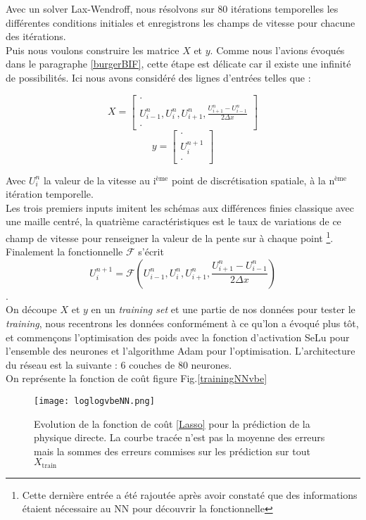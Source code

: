 \documentclass[a4paper,12pt]{article}
\newcommand{\bepar}[1]{
	\left( #1 \right)  
}
\numberwithin{equation}{section} %
\begin{document}
\noindent Avec un solver Lax-Wendroff, nous résolvons sur 80 itérations temporelles les différentes conditions initiales et enregistrons les champs de vitesse pour chacune des itérations.\\
Puis nous voulons construire les matrice $X$ et $y$. Comme nous l'avions évoqués dans le paragraphe \eqref{burgerBIF}, cette étape est délicate car il existe une infinité de possibilités. Ici nous avons considéré des lignes d'entrées telles que :
\begin{multicols}{2}
	\noindent
	$$ X = \left[ \begin{array}{c} \cdot \\ U^n_{i-1},U^n_{i}, U^n_{i+1}, \frac{U^n_{i+1} - U^n_{i-1}}{2\Delta x}  \\ \cdot 
					  \end{array}
		   \right]
	$$
	\columnbreak
	$$ y = \left[ \begin{array}{c} \cdot \\ U^{n+1}_i \\ \cdot 
			  \end{array}
	   \right]
	$$
	\end{multicols}
  
\noindent Avec $U_i^n$ la valeur de la vitesse au i$^{\text{ème}}$ point de discrétisation spatiale, à la n$^{\text{ème}}$ itération temporelle.\\
 Les trois premiers inputs imitent les schémas aux différences finies classique avec une maille centré, la quatrième caractéristiques est le taux de variations de ce champ de vitesse pour renseigner la valeur de la pente sur à chaque point \footnote{Cette dernière entrée a été rajoutée après avoir constaté que des informations étaient nécessaire au NN pour découvrir la fonctionnelle}. \\
 Finalement la fonctionnelle $\mathcal{F}$ s'écrit $$U^{n+1}_i =  \mathcal{F}\bepar{U^n_{i-1},U^n_{i}, U^n_{i+1}, \frac{U^n_{i+1} - U^n_{i-1}}{2\Delta x}}$$.\\
   On découpe $X$ et $y$ en un \textit{training set} et une partie de nos données pour tester le \textit{training}, nous recentrons les données conformément à ce qu'lon a évoqué plus tôt, et commençons l'optimisation des poids avec la fonction d'activation SeLu pour l'ensemble des neurones et l'algorithme Adam pour l'optimisation. L'architecture du réseau est la suivante : 6 couches de 80 neurones.\\
    On représente la fonction de coût figure Fig.\eqref{trainingNNvbe}
    \begin{figure}[!ht]
    \centering
    \texttt{[image: loglogvbeNN.png]}
    \caption{\small{Evolution de la fonction de coût \eqref{Lasso}} pour la prédiction de la physique directe. La courbe tracée n'est pas la moyenne des erreurs mais la sommes des erreurs commises sur les prédiction sur tout $X_{\text{train}}$ }
    \label{trainingNNvbe}
    \end{figure}
    
\end{document}
